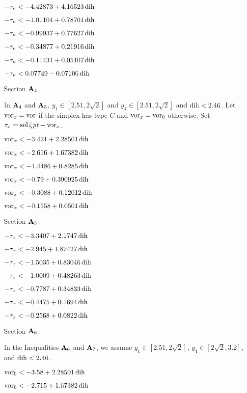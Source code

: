  $-\tau_\nu < -4.42873 + 4.16523\operatorname{dih}$

 $-\tau_\nu < -1.01104 + 0.78701\operatorname{dih}$

 $-\tau_\nu < -0.99937 + 0.77627\operatorname{dih}$

 $-\tau_\nu < -0.34877 + 0.21916\operatorname{dih}$

 $-\tau_\nu < -0.11434 + 0.05107\operatorname{dih}$

 $-\tau_\nu < 0.07749 - 0.07106\operatorname{dih}$

\subhead Section ${\bold A}_4$\endsubhead

In ${\bold A}_4$ and ${\bold A}_5$,  $y_1\in[2.51,2\sqrt{2}]$ and
$y_4\in[2.51,2\sqrt{2}]$ and $\operatorname{dih}<2.46$.
Let $\operatorname{vor}_x = \operatorname{vor}$ if the simplex has type $C$ and 
$\operatorname{vor}_x=\operatorname{vor}_0$ otherwise.  Set $\tau_x =\operatorname{sol}\zeta\hbox{\it pt} - \operatorname{vor}_x$.


  $\operatorname{vor}_x < -3.421 + 2.28501 \operatorname{dih}$

 $\operatorname{vor}_x < -2.616 + 1.67382 \operatorname{dih}$

 $\operatorname{vor}_x < -1.4486 + 0.8285 \operatorname{dih}$

 $\operatorname{vor}_x < -0.79 + 0.390925 \operatorname{dih}$

 $\operatorname{vor}_x < -0.3088 + 0.12012 \operatorname{dih}$

 $\operatorname{vor}_x < -0.1558 + 0.0501 \operatorname{dih}$

\subhead Section ${\bold A}_5$\endsubhead

 $-\tau_x < -3.3407 + 2.1747 \operatorname{dih}$

 $-\tau_x < -2.945 + 1.87427 \operatorname{dih}$

 $-\tau_x < -1.5035 + 0.83046 \operatorname{dih}$

 $-\tau_x < -1.0009 + 0.48263 \operatorname{dih}$

 $-\tau_x < -0.7787 + 0.34833 \operatorname{dih}$

 $-\tau_x < -0.4475 + 0.1694 \operatorname{dih}$

 $-\tau_x < -0.2568 + 0.0822 \operatorname{dih}$

\subhead Section ${\bold A}_6$\endsubhead

In the Inequalities ${\bold A}_6$ and ${\bold A}_7$, we assume $y_1\in[2.51,2\sqrt{2}]$,
$y_4\in[2\sqrt{2},3.2]$, and $\operatorname{dih}<2.46$.

  $\operatorname{vor}_0 < -3.58 + 2.28501 \operatorname{dih}$

 $\operatorname{vor}_0 < -2.715 + 1.67382 \operatorname{dih}$

